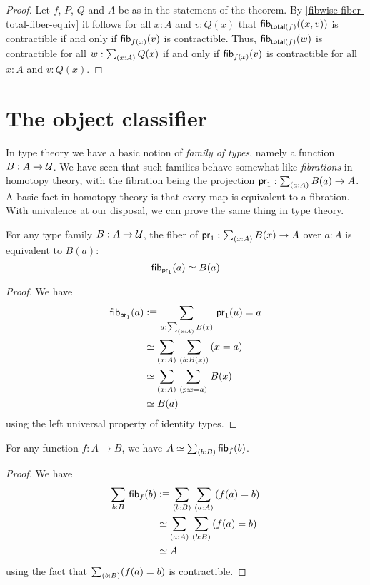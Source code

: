 \begin{proof}
Let $f$, $P$, $Q$ and $A$ be as in the statement of the theorem.
By \autoref{fibwise-fiber-total-fiber-equiv} it follows for all
$x:A$ and $v:Q(x)$ that
${\mathsf{fib}}_{\mathsf{total}(f)}({\mathopen{}(x,v)\mathclose{}})$ is contractible if and only if
${\mathsf{fib}}_{f(x)}(v)$ is contractible.
Thus, ${\mathsf{fib}}_{\mathsf{total}(f)}(w)$ is contractible for all $w:\sm{x:A}Q(x)$ if and only if ${\mathsf{fib}}_{f(x)}(v)$ is contractible for all $x:A$ and $v:Q(x)$.
\end{proof}


\section{The object classifier}
\label{sec:object-classification}

In type theory we have a basic notion of \emph{family of types}, namely a function $B:A\to\mathcal{U}$.
We have seen that such families behave somewhat like \emph{fibrations} in homotopy theory, with the fibration being the projection $\proj1:\sm{a:A} B(a) \to A$.
A basic fact in homotopy theory is that every map is equivalent to a fibration.
With univalence at our disposal, we can prove the same thing in type theory.

\begin{lem}\label{thm:fiber-of-a-fibration}
  For any type family $B:A\to\mathcal{U}$, the fiber of $\proj1:\sm{x:A} B(x) \to A$ over $a:A$ is equivalent to $B(a)$:
  \[ {\mathsf{fib}}_{\mathsf{pr}_{1}}(a) \simeq B(a) \]
\end{lem}
\begin{proof}
  We have
  \begin{align*}
    \hfib{\proj1}{a} &\defeq \sm{u:\sm{x:A} B(x)} \proj1(u)=a\\
    &\eqvsym \sm{x:A}{b:B(x)} (x=a)\\
    &\eqvsym \sm{x:A}{p:x=a} B(x)\\
    &\eqvsym B(a)
  \end{align*}
  using the left universal property of identity types.
\end{proof}

\begin{lem}\label{thm:total-space-of-the-fibers}
  For any function $f:A\to B$, we have $\eqv{A}{\sm{b:B}\hfib{f}{b}}$.
\end{lem}
\begin{proof}
  We have
  \begin{align*}
    \sm{b:B}\hfib{f}{b} &\defeq \sm{b:B}{a:A} (f(a)=b)\\
    &\eqvsym \sm{a:A}{b:B} (f(a)=b)\\
    &\eqvsym A
  \end{align*}
  using the fact that $\sm{b:B} (f(a)=b)$ is contractible.
\end{proof}

